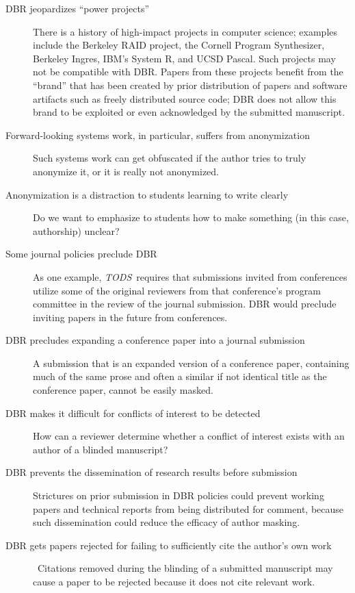 \documentclass[acmtods,acmnow]{acmtrans2m}
\newcommand{\tods}{{\em TODS\/}}
\begin{document}
\begin{description}
\item[DBR jeopardizes ``power projects'']
There is a history of high-impact projects in computer science; examples
include the Berkeley RAID project, the Cornell Program Synthesizer, Berkeley
Ingres,
IBM's System R, and UCSD Pascal. Such projects may not be compatible with
DBR. Papers from these projects benefit from the ``brand'' that has been
created by prior distribution of papers and software artifacts such as freely
distributed source code; DBR does not allow this brand to be exploited or
even acknowledged by the submitted manuscript.

\item[Forward-looking systems work, in particular, suffers from
anonymization]
Such systems work can get obfuscated if the author tries to truly anonymize
it, or it is really not anonymized.

\item[Anonymization is a distraction to students learning to write  
clearly]
Do we want to emphasize to students how to make something (in this case,
authorship) unclear?

\item[Some journal policies preclude DBR]
As one example, \tods\ requires that submissions invited from conferences
utilize some of the original reviewers from that conference's program
committee in the review of the journal submission. DBR would
preclude inviting papers in the future from conferences.

\item[DBR precludes expanding a conference paper into a journal submission]
A submission that is an expanded version of a conference paper, containing
much of the same prose and often a similar if not identical title as the
conference paper, cannot be easily masked.

\item[DBR makes it difficult for conflicts of interest to be detected] How
can a reviewer determine whether a conflict of 
interest exists with an author of a blinded manuscript?

\item[DBR prevents the dissemination of research results before submission]
Strictures on prior submission in DBR policies could prevent working papers and
technical reports from being distributed for comment, because such
dissemination could reduce the efficacy of author masking.

\item[DBR gets papers rejected for failing to sufficiently cite the author's
own work]\ 
Citations removed during the blinding of a submitted manuscript may cause a
paper to be rejected because it does not cite relevant work.


\end{description}
\end{document}
